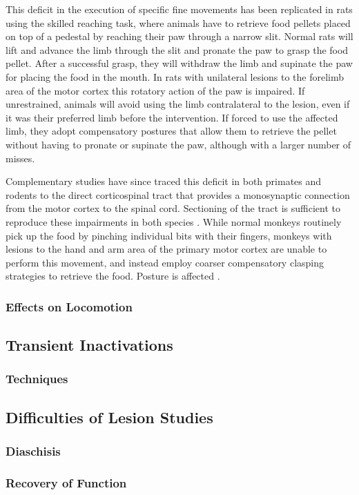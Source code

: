 This deficit in the execution of specific fine movements has been replicated in rats using the skilled reaching task, where animals have to retrieve food pellets placed on top of a pedestal by reaching their paw through a narrow slit. Normal rats will lift and advance the limb through the slit and pronate the paw to grasp the food pellet. After a successful grasp, they will withdraw the limb and supinate the paw for placing the food in the mouth. In rats with unilateral lesions to the forelimb area of the motor cortex this rotatory action of the paw is impaired. If unrestrained, animals will avoid using the limb contralateral to the lesion, even if it was their preferred limb before the intervention. If forced to use the affected limb, they adopt compensatory postures that allow them to retrieve the pellet without having to pronate or supinate the paw, although with a larger number of misses.

Complementary studies have since traced this deficit in both primates and rodents to the direct corticospinal tract that provides a monosynaptic connection from the motor cortex to the spinal cord. Sectioning of the tract is sufficient to reproduce these impairments in both species \cite{Lawrence1968}. While normal monkeys routinely pick up the food by pinching individual bits with their fingers, monkeys with lesions to the hand and arm area of the primary motor cortex are unable to perform this movement, and instead employ coarser compensatory clasping strategies to retrieve the food. Posture is affected \cite{Lashley1924}.

\subsubsection{Effects on Locomotion}

\subsection{Transient Inactivations}

\subsubsection{Techniques}

\subsection{Difficulties of Lesion Studies}

\subsubsection{Diaschisis}

\subsubsection{Recovery of Function}
